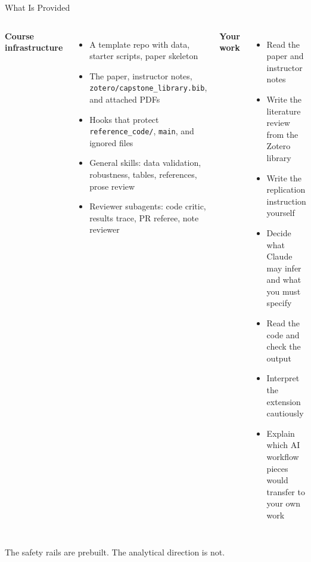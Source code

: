 \documentclass[aspectratio=169, 11pt]{beamer}
\begin{document}
\begin{frame}{What Is Provided}
  \begin{columns}[T]
    \textbf{Course infrastructure}
    \begin{itemize}\small
      \item A template repo with data, starter scripts, paper skeleton
      \item The paper, instructor notes, \texttt{zotero/capstone\_library.bib}, and attached PDFs
      \item Hooks that protect \texttt{reference\_code/}, \texttt{main}, and ignored files
      \item General skills: data validation, robustness, tables, references, prose review
      \item Reviewer subagents: code critic, results trace, PR referee, note reviewer
    \end{itemize}

    \textbf{Your work}
    \begin{itemize}\small
      \item Read the paper and instructor notes
      \item Write the literature review from the Zotero library
      \item Write the replication instruction yourself
      \item Decide what Claude may infer and what you must specify
      \item Read the code and check the output
      \item Interpret the extension cautiously
      \item Explain which AI workflow pieces would transfer to your own work
    \end{itemize}
  \end{columns}

  \vspace{0.7em}
  \alert{\small The safety rails are prebuilt. The analytical direction is not.}
\end{frame}
\end{document}

